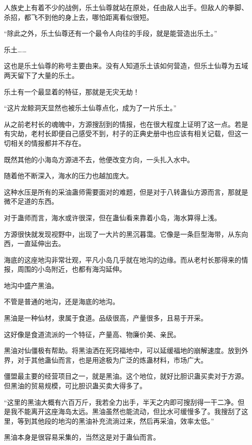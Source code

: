 \begin{this_body}
人族史上有着不少的战例，乐土仙尊就站在原处，任由敌人出手。但敌人的拳脚、杀招，都飞不到他的身上去，哪怕距离看似很短。

“除此之外，乐土仙尊还有一个最令人向往的手段，就是能营造出乐土。”

乐土……

这也是乐土仙尊的称号主要由来。没有人知道乐土该如何营造，但乐土仙尊为五域两天留下了大量的乐土。

乐土有一个最显着的特征，那就是无灾无劫！

“这片龙鲸洞天显然也被乐土仙尊点化，成为了一片乐土。”

从之前老村长的魂魄中，方源搜刮到的情报，也在很大程度上证明了这一点。若是有灾劫，老村长即便自己感受不到，村子的正典史册中也应该有相关记载，但这一切相关的情报都并不存在。

既然其他的小海岛方源进不去，他便改变方向，一头扎入水中。

随着他不断深入，海水的压力也越加庞大。

这种水压是所有的采油蛊师需要面对的难题，但是对于八转蛊仙方源而言，那就是微不足道的东西。

对于蛊师而言，海水或许很深，但在蛊仙看来靠着小岛，海水算得上浅。

方源很快就发现视野中，出现了一大片的黑沉暮霭。它像是一条巨型海带，从东向西，一直延伸出去。

海底的这座地沟非常壮观，平凡小岛几乎就在地沟的边缘。而从老村长那得来的情报，周围的小岛附近，也都有海沟延伸。

地沟中盛产黑油。

不管是普通的地沟，还是海底的地沟。

黑油是一种仙材，隶属于食道。品级很高，产量很多，且易于开采。

这好像是食道流派的一个特征，产量高、物廉价美、亲民。

黑油对仙僵极有帮助。将黑油洒在死窍福地中，可以延缓福地的崩解速度。放到外界，对于其他蛊仙而言，也是用途极为广泛的炼蛊材料，市场广大。

僵盟最主要的经营项目之一，就是黑油。这个地位，就好比胆识蛊买卖对于方源。但黑油的贸易规模，可比胆识蛊买卖大得多了。

“这里的黑油大概有六百万斤，我若全力出手，半天之内即可搜刮得一干二净。但是我不能离开这座海岛太远。黑油虽然也能流动，但比水可缓慢多了。我搜刮了这里，等到其他段的地沟的黑油补充流淌过来，然后再采油，效率太低。”

黑油本身是很容易采集的，当然这是对于蛊仙而言。


\end{this_body}
